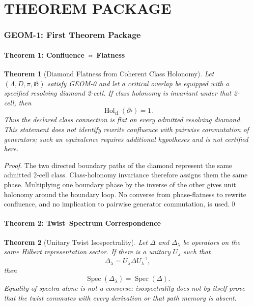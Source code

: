\documentclass[12pt, oneside]{article}
\newtheorem{theorem}{Theorem}[section]
\DeclareMathOperator{\Spec}{Spec}
\DeclareMathOperator{\Hol}{Hol}
\newcommand{\cl}{\mathrm{cl}}
\begin{document}
\part{THEOREM PACKAGE}

\section{GEOM-1: First Theorem Package}

\subsection{Theorem 1: Confluence ⇔ Flatness}

\begin{theorem}[Diamond Flatness from Coherent Class Holonomy]
Let $(\Lambda,D,\pi,\mathfrak G)$ satisfy GEOM-0 and let a critical overlap be equipped with a specified resolving diamond 2-cell. If class holonomy is invariant under that 2-cell, then
\[
\Hol_{\cl}(\partial\square)=1.
\]
Thus the declared class connection is flat on every admitted resolving diamond. This statement does not identify rewrite confluence with pairwise commutation of generators; such an equivalence requires additional hypotheses and is not certified here.
\end{theorem}

\begin{proof}
The two directed boundary paths of the diamond represent the same admitted 2-cell class. Class-holonomy invariance therefore assigns them the same phase. Multiplying one boundary phase by the inverse of the other gives unit holonomy around the boundary loop. No converse from phase-flatness to rewrite confluence, and no implication to pairwise generator commutation, is used.\qed
\end{proof}

\subsection{Theorem 2: Twist–Spectrum Correspondence}

\begin{theorem}[Unitary Twist Isospectrality]
Let $\Delta$ and $\Delta_\lambda$ be operators on the same Hilbert representation sector. If there is a unitary $U_\lambda$ such that
\[
\Delta_\lambda=U_\lambda\Delta U_\lambda^{-1},
\]
then
\[
\Spec(\Delta_\lambda)=\Spec(\Delta).
\]
Equality of spectra alone is not a converse: isospectrality does not by itself prove that the twist commutes with every derivation or that path memory is absent.
\end{theorem}
\end{document}
